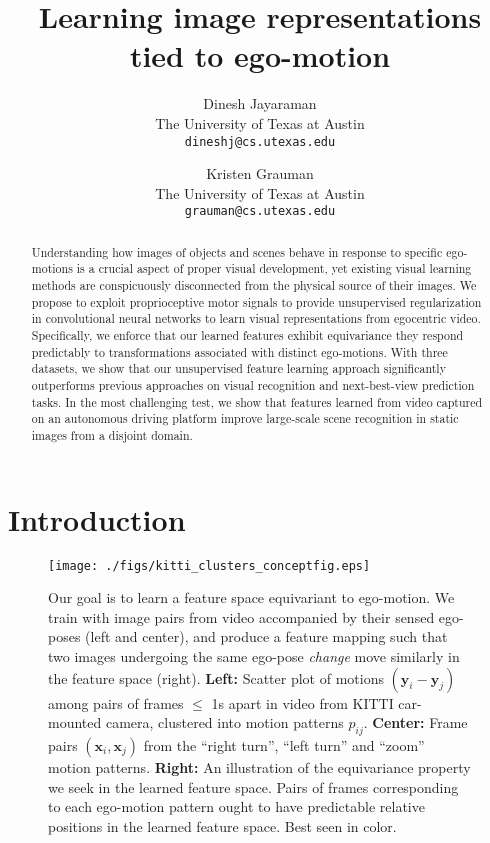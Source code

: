 \documentclass[10pt,twocolumn,letterpaper]{article}
\begin{document}
\title{Learning image representations tied to ego-motion}

\author{Dinesh Jayaraman\\
The University of Texas at Austin\\
{\tt\small dineshj@cs.utexas.edu}
\and
Kristen Grauman\\
The University of Texas at Austin\\
{\tt\small grauman@cs.utexas.edu}
}

\maketitle

\begin{abstract}
  Understanding how images of objects and scenes behave in response to specific ego-motions is a crucial aspect of proper visual development, yet existing visual learning methods are conspicuously disconnected from the physical source of their images.  We propose to exploit proprioceptive motor signals to provide unsupervised regularization in convolutional neural networks to learn visual representations from egocentric video. Specifically, we enforce that our learned features exhibit equivariance \ie they respond predictably to transformations associated with distinct ego-motions.  With three datasets, we show that our unsupervised feature learning approach significantly outperforms previous approaches on visual recognition and next-best-view prediction tasks.  In the most challenging test, we show that features learned from video captured on an autonomous driving platform improve large-scale scene recognition in static images from a disjoint domain.
\end{abstract}
\vspace{-0.1in}\section{Introduction}\label{sec:intro}\begin{figure*}[t]
  \centering
  \texttt{[image: ./figs/kitti\_clusters\_conceptfig.eps]}
  \caption{Our goal is to learn a feature space equivariant to ego-motion.  We train with image pairs from video accompanied by their sensed ego-poses (left and center), and produce a feature mapping such that two images undergoing the same ego-pose \emph{change} move similarly in the feature space (right).  \textbf{Left:}  Scatter plot of motions $(\bm{y}_i - \bm{y}_j)$ among pairs of frames $\leq$ 1s apart in video from KITTI car-mounted camera, clustered into motion patterns $p_{ij}$. \textbf{Center:} Frame pairs $(\bm{x}_i,\bm{x}_j)$ from the ``right turn'', ``left turn'' and ``zoom'' motion patterns. \textbf{Right:} An illustration of the equivariance property we seek in the learned feature space. Pairs of frames corresponding to each ego-motion pattern ought to have predictable relative positions in the learned feature space.  Best seen in color.}
\vspace{-0.1in}
  \label{fig:conceptfig}
\end{figure*}%
\end{document}
